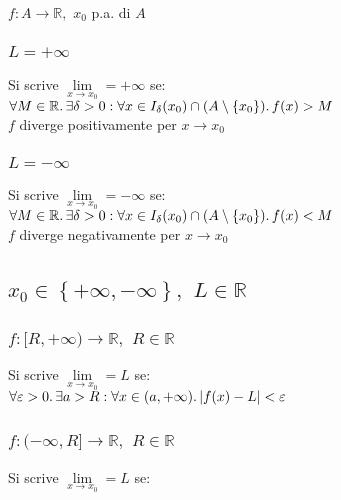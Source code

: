 \documentclass[a4paper, twoside, italian, 11pt]{book}
\newcommand{\braces}[1] {\left \{ #1 \right \}}
\newcommand{\abs}[1] {\left | #1 \right |}
\newcommand{\R}{\mathbb{R}}
\begin{document}
\noindent
$f : A \rightarrow \R,$ $x_0$ p.a. di $A$


\subsubsection{$L = +\infty$}

\noindent
Si scrive $\lim\limits_{x \to x_0} = +\infty$ se: \\

\noindent
$\forall M \in \R \ldotp \exists \delta > 0 : \forall x \in I_\delta(x_0) \cap (A \setminus \braces{x_0}) \ldotp f(x) > M$ \\

\noindent
$f$ diverge positivamente per $x \to x_0$


\subsubsection{$L = -\infty$}

\noindent
Si scrive $\lim\limits_{x \to x_0} = -\infty$ se: \\

\noindent
$\forall M \in \R \ldotp \exists \delta > 0 : \forall x \in I_\delta(x_0) \cap (A \setminus \braces{x_0}) \ldotp f(x) < M$ \\

\noindent
$f$ diverge negativamente per $x \to x_0$


\subsection{$x_0 \in \braces{+\infty, -\infty},$ $L \in \R$}


\subsubsection{$f: [R, +\infty) \rightarrow \R,$ $R \in \R$}

\noindent
Si scrive $\lim\limits_{x \to x_0} = L$ se: \\

\noindent
$\forall \varepsilon > 0 \ldotp \exists a > R : \forall x \in (a, +\infty) \ldotp \abs{f(x) - L} < \varepsilon$


\subsubsection{$f: (-\infty, R] \rightarrow \R,$ $R \in \R$}

\noindent
Si scrive $\lim\limits_{x \to x_0} = L$ se: \\
\end{document}
